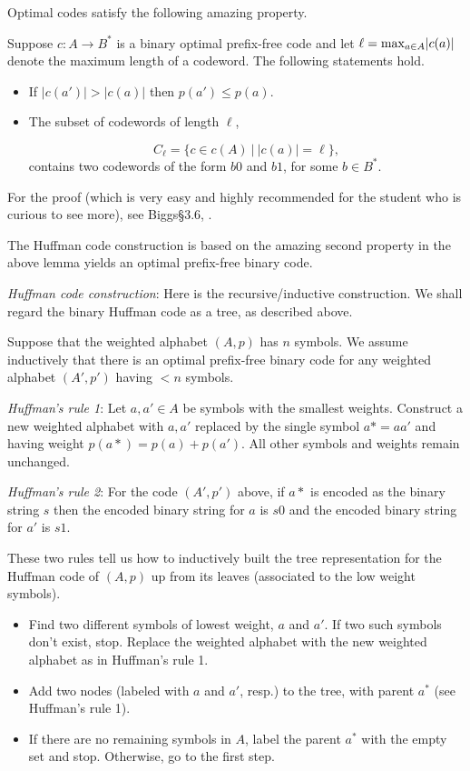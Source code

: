 Optimal codes satisfy the following amazing property.

\begin{lemma}
{\rm
Suppose $c:A\to B^*$ is a binary optimal prefix-free code
and let $\ell = {\rm max}_{a\in A} |c(a)|$ denote
the maximum length of a codeword.
The following statements hold.
\begin{itemize}
\item
If $|c(a')|>|c(a)|$ then $p(a')\leq p(a)$.
\item
The subset of codewords of length $\ell$,

\[
C_\ell = \{c\in c(A)\ |\ |c(a)|=\ell\},
\]
contains two codewords of the form
$b0$ and $b1$, for some $b\in B^*$.

\end{itemize}
}
\end{lemma}

For the proof (which is very easy and highly recommended for the
student who is curious to see more), see Biggs\S 3.6, \cite{Biggs2009}.

The Huffman code construction is based on the
amazing second property in the above lemma
yields an optimal prefix-free binary code.

{\it Huffman code construction}: Here is the recursive/inductive
construction. We shall regard the binary Huffman code as a tree,
as described above.

Suppose that the weighted alphabet $(A,p)$ has $n$ symbols.
We assume inductively that there is an optimal prefix-free
binary code for any weighted alphabet $(A',p')$ having
$<n$ symbols.

\noindent
{\it Huffman's rule 1}:
Let $a,a'\in A$ be symbols with the smallest weights.
Construct a new weighted alphabet with
$a,a'$ replaced by the single symbol $a*=aa'$
and having weight $p(a*)=p(a)+p(a')$.
All other symbols and weights remain unchanged.

\noindent
{\it Huffman's rule 2}:
For the code $(A',p')$ above, if $a*$ is encoded
as the binary string $s$ then the encoded binary string for
$a$ is $s0$ and the encoded binary string for
$a'$ is $s1$.

These two rules tell us how to inductively built
the tree representation for the Huffman code of $(A,p)$ up
from its leaves (associated to the low weight symbols).

\begin{itemize}
\item
Find two different symbols of lowest weight, $a$ and $a'$.
If two such symbols don't exist, stop.
Replace the weighted alphabet with the new weighted alphabet
as in Huffman's rule 1.

\item
Add two nodes (labeled with $a$ and $a'$, resp.)
to the tree, with parent $a^*$ (see Huffman's rule 1).

\item
If there are no remaining symbols in $A$, label the parent
$a^*$ with the empty set and stop. Otherwise, go to the
first step.

\end{itemize}

